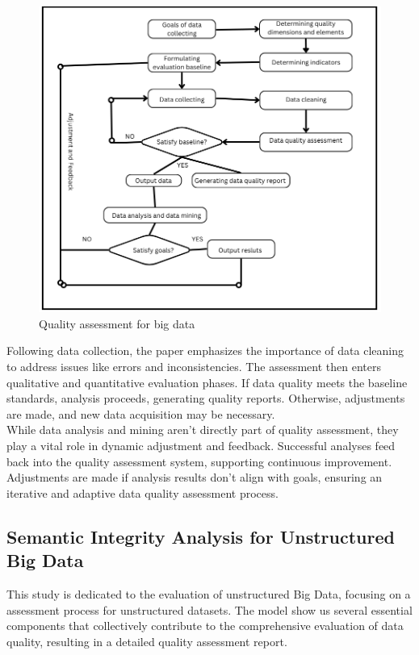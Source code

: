 \documentclass[10pt,a4paper]{article}
\begin{document}
\begin{figure}[htbp]
  \centering
  \includegraphics[width=0.8\columnwidth]{Quality assesment process for Big Data.png}
  \caption{Quality assessment for big data}
  \label{fig:quality-assessment}
\end{figure}

Following data collection, the paper emphasizes the importance of data cleaning to address issues like errors and inconsistencies. The assessment then enters qualitative and quantitative evaluation phases. If data quality meets the baseline standards, analysis proceeds, generating quality reports. Otherwise, adjustments are made, and new data acquisition may be necessary.\cite{article}
\\
While data analysis and mining aren't directly part of quality assessment, they play a vital role in dynamic adjustment and feedback. Successful analyses feed back into the quality assessment system, supporting continuous improvement. Adjustments are made if analysis results don't align with goals, ensuring an iterative and adaptive data quality assessment process.\cite{article}

\subsection{Semantic Integrity Analysis for Unstructured Big Data}
This study is dedicated to the evaluation of unstructured Big Data, focusing on a assessment process for unstructured datasets. The model show us several essential components that collectively contribute to the comprehensive evaluation of data quality, resulting in a detailed quality assessment report.\cite{8605945}
\end{document}
